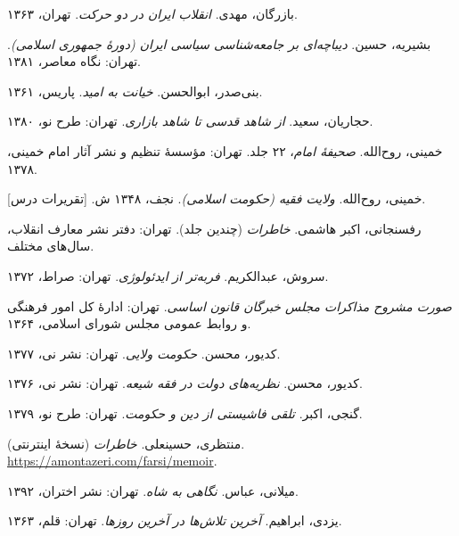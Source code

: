 \documentclass[12pt,a4paper]{book}
\begin{document}
\begin{enumerate}[label={[\arabic*]}, leftmargin=2cm]

\item
بازرگان، مهدی.
\textit{انقلاب ایران در دو حرکت}.
تهران، ۱۳۶۳.

\item
بشیریه، حسین.
\textit{دیباچه‌ای بر جامعه‌شناسی سیاسی ایران (دورهٔ جمهوری اسلامی)}.
تهران: نگاه معاصر، ۱۳۸۱.

\item
بنی‌صدر، ابوالحسن.
\textit{خیانت به امید}.
پاریس، ۱۳۶۱.

\item
حجاریان، سعید.
\textit{از شاهد قدسی تا شاهد بازاری}.
تهران: طرح نو، ۱۳۸۰.

\item
خمینی، روح‌الله.
\textit{صحیفهٔ امام}، ۲۲ جلد.
تهران: مؤسسهٔ تنظیم و نشر آثار امام خمینی، ۱۳۷۸.

\item
خمینی، روح‌الله.
\textit{ولایت فقیه (حکومت اسلامی)}.
نجف، ۱۳۴۸ ش. [تقریرات درس].

\item
رفسنجانی، اکبر هاشمی.
\textit{خاطرات} (چندین جلد).
تهران: دفتر نشر معارف انقلاب، سال‌های مختلف.

\item
سروش، عبدالکریم.
\textit{فربه‌تر از ایدئولوژی}.
تهران: صراط، ۱۳۷۲.

\item
\textit{صورت مشروح مذاکرات مجلس خبرگان قانون اساسی}.
تهران: ادارهٔ کل امور فرهنگی و روابط عمومی مجلس شورای اسلامی، ۱۳۶۴.

\item
کدیور، محسن.
\textit{حکومت ولایی}.
تهران: نشر نی، ۱۳۷۷.

\item
کدیور، محسن.
\textit{نظریه‌های دولت در فقه شیعه}.
تهران: نشر نی، ۱۳۷۶.

\item
گنجی، اکبر.
\textit{تلقی فاشیستی از دین و حکومت}.
تهران: طرح نو، ۱۳۷۹.

\item
منتظری، حسینعلی.
\textit{خاطرات} (نسخهٔ اینترنتی).
\url{https://amontazeri.com/farsi/memoir}.

\item
میلانی، عباس.
\textit{نگاهی به شاه}.
تهران: نشر اختران، ۱۳۹۲.

\item
یزدی، ابراهیم.
\textit{آخرین تلاش‌ها در آخرین روزها}.
تهران: قلم، ۱۳۶۳.

\end{enumerate}
\end{document}
